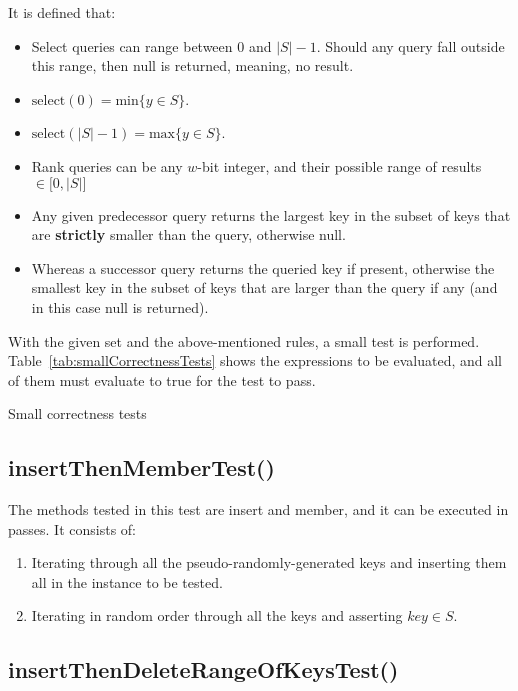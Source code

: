 It is defined that:
\begin{itemize}
    \item
    Select queries can range between $0$ and $|S|-1$. Should any query fall outside this range, then {\ttfamily null} is returned, meaning, no result.
    \item
    $\text{select}(0) = \text{min}\{y \in S \}$.
    \item
    $\text{select}(|S|-1) = \text{max}\{y \in S\}$.
    \item
    Rank queries can be any $w$-bit integer, and their possible range of results $\in \big[ 0, |S| \big]$
    \item
    Any given predecessor query returns the largest key in the subset of keys that are \textbf{strictly} smaller than the query, otherwise {\ttfamily null}.
    \item
    Whereas a successor query returns the queried key if present, otherwise the smallest key in the subset of keys that are larger than the query if any (and in this case {\ttfamily null} is returned).
\end{itemize}

With the given set and the above-mentioned rules, a small test is performed. Table~\ref{tab:smallCorrectnessTests} shows the expressions to be evaluated, and all of them must evaluate to {\ttfamily true} for the test to pass.

\begin{table}[H]
\centering

\caption{Small correctness tests}
\label{tab:smallCorrectnessTests}
\end{table}


\subsection{{\ttfamily insertThenMemberTest()}}

The methods tested in this test are {\ttfamily insert} and {\ttfamily member}, and it can be executed in passes. It consists of:
\begin{enumerate}
    \item
    Iterating through all the pseudo-randomly-generated keys and inserting them all in the instance to be tested.
    \item
    Iterating in random order through all the keys and asserting $key \in S$.
\end{enumerate}

\subsection{{\ttfamily insertThenDeleteRangeOfKeysTest()}}

